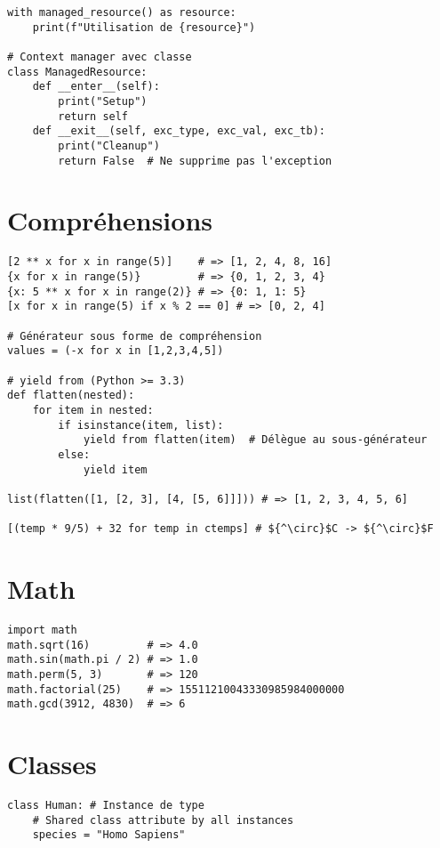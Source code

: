 \documentclass{article}
\begin{document}
\begin{multicols*}{4}
\begin{lstlisting}
with managed_resource() as resource:
    print(f"Utilisation de {resource}")

# Context manager avec classe
class ManagedResource:
    def __enter__(self):
        print("Setup")
        return self
    def __exit__(self, exc_type, exc_val, exc_tb):
        print("Cleanup")
        return False  # Ne supprime pas l'exception
\end{lstlisting}

\section*{Compréhensions}
\begin{lstlisting}[mathescape]
[2 ** x for x in range(5)]    # => [1, 2, 4, 8, 16]
{x for x in range(5)}         # => {0, 1, 2, 3, 4}
{x: 5 ** x for x in range(2)} # => {0: 1, 1: 5}
[x for x in range(5) if x % 2 == 0] # => [0, 2, 4]

# Générateur sous forme de compréhension
values = (-x for x in [1,2,3,4,5])

# yield from (Python >= 3.3)
def flatten(nested):
    for item in nested:
        if isinstance(item, list):
            yield from flatten(item)  # Délègue au sous-générateur
        else:
            yield item

list(flatten([1, [2, 3], [4, [5, 6]]])) # => [1, 2, 3, 4, 5, 6]

[(temp * 9/5) + 32 for temp in ctemps] # ${^\circ}$C -> ${^\circ}$F
\end{lstlisting}

\section*{Math}
\begin{lstlisting}
import math
math.sqrt(16)         # => 4.0
math.sin(math.pi / 2) # => 1.0
math.perm(5, 3)       # => 120
math.factorial(25)    # => 15511210043330985984000000
math.gcd(3912, 4830)  # => 6
\end{lstlisting}

\section*{Classes}
\begin{lstlisting}
class Human: # Instance de type
    # Shared class attribute by all instances
    species = "Homo Sapiens"


\end{lstlisting}
\end{multicols*}
\end{document}
